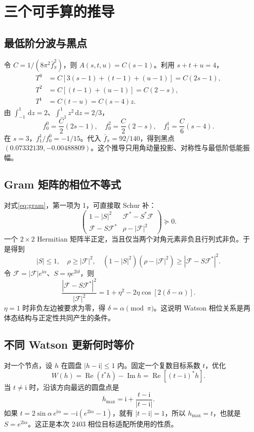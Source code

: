 \documentclass[UTF8,a4paper,11pt,fontset=fandol]{ctexart}
\numberwithin{equation}{section}
\newcommand{\dd}{\,\mathrm d}
\newcommand{\ii}{\mathrm i}
\newcommand{\Ree}{\operatorname{Re}}
\newcommand{\Imm}{\operatorname{Im}}
\newcommand{\Fcal}{\mathcal F}
\begin{document}
\section{三个可手算的推导}\label{app:derivations}
\subsection{最低阶分波与黑点}\label{app:chiral}
令 \(C=1/(8\pi^2\bar f_\pi^2)\)，则 \(A(s,t,u)=C(s-1)\)。利用 \(s+t+u=4\)，
\begin{align}
T^0&=C[3(s-1)+(t-1)+(u-1)]=C(2s-1),\\
T^2&=C[(t-1)+(u-1)]=C(2-s),\\
T^1&=C(t-u)=C(s-4)z.
\end{align}
由 \(\int_{-1}^1\dd z=2\)、\(\int_{-1}^1z^2\dd z=2/3\)，
\begin{equation}
f_0^0=\frac C2(2s-1),\quad f_0^2=\frac C2(2-s),\quad
f_1^1=\frac C6(s-4).
\end{equation}
在 \(s=3\)，\(f_1^1/f_0^0=-1/15\)。代入 \(\bar f_\pi=92/140\)，得到黑点 \((0.07332139,-0.00488809)\)。这个推导只用角动量投影、对称性与最低阶低能振幅。

\subsection{Gram 矩阵的相位不等式}\label{app:gram}
对式\eqref{eq:gram}，第一项为 1，可直接取 Schur 补：
\begin{equation}
\begin{pmatrix}
1-|S|^2&\Fcal^*-S^*\Fcal\\
\Fcal-S\Fcal^*&\rho-|\Fcal|^2
\end{pmatrix}\succeq0.
\end{equation}
一个 \(2\times2\) Hermitian 矩阵半正定，当且仅当两个对角元素非负且行列式非负。于是得到
\begin{equation}
|S|\le1,\quad \rho\ge|\Fcal|^2,\quad
(1-|S|^2)(\rho-|\Fcal|^2)\ge|\Fcal-S\Fcal^*|^2.
\end{equation}
令 \(\Fcal=|\Fcal|e^{\ii\alpha}\)、\(S=\eta e^{2\ii\delta}\)，则
\begin{equation}
\frac{|\Fcal-S\Fcal^*|^2}{|\Fcal|^2}
=1+\eta^2-2\eta\cos[2(\delta-\alpha)].
\end{equation}
\(\eta=1\) 时非负左边被要求为零，得 \(\delta=\alpha\pmod\pi\)。这说明 Watson 相位关系是两体态结构与正定性共同产生的条件。

\subsection{不同 Watson 更新何时等价}\label{app:iteration}
对一个节点，设 \(h\) 在圆盘 \(|h-\ii|\le1\) 内。固定一个复数目标系数 \(t\)，优化
\begin{equation}
W(h)=\Ree(t^*h)-\Imm h=\Ree[(t-\ii)^*h].
\end{equation}
当 \(t\neq\ii\) 时，沿该方向最远的圆盘点是
\begin{equation}\label{eq:diskargmax}
h_{\max}=\ii+\frac{t-\ii}{|t-\ii|}.
\end{equation}
如果 \(t=2\sin\alpha\,e^{\ii\alpha}=-\ii(e^{2\ii\alpha}-1)\)，就有 \(|t-\ii|=1\)，所以 \(h_{\max}=t\)，也就是 \(S=e^{2\ii\alpha}\)。这正是本次 2403 相位目标适配所使用的性质。
\end{document}
